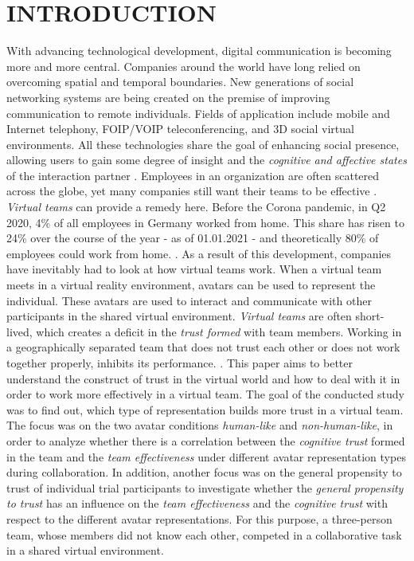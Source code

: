 \documentclass[sigchi]{acmart}
\begin{document}
\maketitle

\section{INTRODUCTION}
With advancing technological development, digital communication is becoming more and more central. Companies around the world have long relied on overcoming spatial and temporal boundaries.
New generations of social networking systems are being created on the premise of improving communication to remote individuals.
Fields of application include mobile and Internet telephony, FOIP/VOIP teleconferencing, and 3D social virtual environments.
All these technologies share the goal of enhancing social presence, allowing users to gain some degree of insight and the \textit{cognitive and affective states} of the interaction partner \citep[p. 3]{biocca2002defining}.
Employees in an organization are often scattered across the globe, yet many companies still want their teams to be effective \citep[p. 791-792]{jarvenpaa1999communication}. \textit{Virtual teams} can provide a remedy here. 
Before the Corona pandemic, in Q2 2020, 4\% of all employees in Germany worked from home. This share has risen to 24\% over the course of the year - as of 01.01.2021 - and theoretically 80\% of employees could work from home. \citep{statistaCorona2020}. As a result of this development, companies have inevitably had to look at how virtual teams work.
When a virtual team meets in a virtual reality environment, avatars can be used to represent the individual. These avatars are used to interact and communicate with other participants in the shared virtual environment.
\textit{Virtual teams} are often short-lived, which creates a deficit in the \textit{trust formed} with team members.
Working in a geographically separated team that does not trust each other or does not work together properly, inhibits its performance. \citep[p. 98-107]{huang1998supporting} \citep[p. 399-417]{turoff1993distributed}. This paper aims to better understand the construct of trust in the virtual world and how to deal with it in order to work more effectively in a virtual team.
The goal of the conducted study was to find out, which type of representation builds more trust in a virtual team. The focus was on the two avatar conditions \textit{human-like} and \textit{non-human-like}, in order to analyze whether there is a correlation between the \textit{cognitive trust} formed in the team and the \textit{team effectiveness} under different avatar representation types during collaboration.
In addition, another focus was on the general propensity to trust of individual trial participants to investigate whether the \textit{general propensity to trust} has an influence on the \textit{team effectiveness} and the \textit{cognitive trust} with respect to the different avatar representations. For this purpose, a three-person team, whose members did not know each other, competed in a collaborative task in a shared virtual environment.
\end{document}
